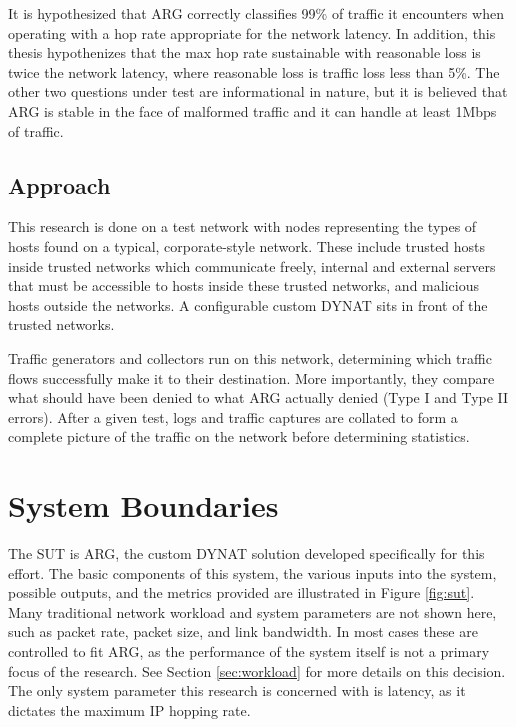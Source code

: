 
\par It is hypothesized that \ac{ARG} correctly classifies 99\% of traffic it encounters when operating with a hop rate appropriate for the network latency. In addition, this thesis hypothenizes that the max hop rate sustainable with reasonable loss is twice the network latency, where reasonable loss is traffic loss less than 5\%. The other two questions under test are informational in nature, but it is believed that \ac{ARG} is stable in the face of malformed traffic and it can handle at least 1Mbps of traffic.  

\subsection{Approach}
\label{sec:approach}
\par This research is done on a test network with nodes representing the types of hosts found on a typical, corporate-style network. These include trusted hosts inside trusted networks which communicate freely, internal and external servers that must be accessible to hosts inside these trusted networks, and malicious hosts outside the networks. A configurable custom \ac{DYNAT} sits in front of the trusted networks. 

\par Traffic generators and collectors run on this network, determining which traffic flows successfully make it to their destination. More importantly, they compare what should have been denied to what \ac{ARG} actually denied (Type I and Type II errors). After a given test, logs and traffic captures are collated to form a complete picture of the traffic on the network before determining statistics.

\FloatBarrier
\section{System Boundaries}
\label{sec:boundaries}
\par The \ac{SUT} is \ac{ARG}, the custom \ac{DYNAT} solution developed specifically for this effort. The basic components of this system, the various inputs into the system, possible outputs, and the metrics provided are illustrated in Figure \ref{fig:sut}. Many traditional network workload and system parameters are not shown here, such as packet rate, packet size, and link bandwidth. In most cases these are controlled to fit \ac{ARG}, as the performance of the system itself is not a primary focus of the research. See Section \ref{sec:workload} for more details on this decision. The only system parameter this research is concerned with is latency, as it dictates the maximum \ac{IP} hopping rate.

